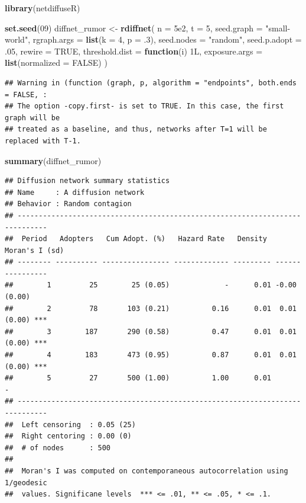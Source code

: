 \documentclass[
]{book}
\newenvironment{Shaded}{\begin{snugshade}}{\end{snugshade}}
\newcommand{\AttributeTok}[1]{\textcolor[rgb]{0.13,0.29,0.53}{#1}}
\newcommand{\ConstantTok}[1]{\textcolor[rgb]{0.56,0.35,0.01}{#1}}
\newcommand{\ControlFlowTok}[1]{\textcolor[rgb]{0.13,0.29,0.53}{\textbf{#1}}}
\newcommand{\DecValTok}[1]{\textcolor[rgb]{0.00,0.00,0.81}{#1}}
\newcommand{\FloatTok}[1]{\textcolor[rgb]{0.00,0.00,0.81}{#1}}
\newcommand{\FunctionTok}[1]{\textcolor[rgb]{0.13,0.29,0.53}{\textbf{#1}}}
\newcommand{\NormalTok}[1]{#1}
\newcommand{\OtherTok}[1]{\textcolor[rgb]{0.56,0.35,0.01}{#1}}
\newcommand{\StringTok}[1]{\textcolor[rgb]{0.31,0.60,0.02}{#1}}
\begin{document}
\begin{Shaded}
\begin{Highlighting}[]
\FunctionTok{library}\NormalTok{(netdiffuseR)}

\FunctionTok{set.seed}\NormalTok{(}\DecValTok{09}\NormalTok{)}
\NormalTok{diffnet\_rumor }\OtherTok{\textless{}{-}} \FunctionTok{rdiffnet}\NormalTok{(}
  \AttributeTok{n =} \FloatTok{5e2}\NormalTok{,}
  \AttributeTok{t =} \DecValTok{5}\NormalTok{, }
  \AttributeTok{seed.graph =} \StringTok{"small{-}world"}\NormalTok{,}
  \AttributeTok{rgraph.args =} \FunctionTok{list}\NormalTok{(}\AttributeTok{k =} \DecValTok{4}\NormalTok{, }\AttributeTok{p =}\NormalTok{ .}\DecValTok{3}\NormalTok{),}
  \AttributeTok{seed.nodes =} \StringTok{"random"}\NormalTok{,}
  \AttributeTok{seed.p.adopt =}\NormalTok{ .}\DecValTok{05}\NormalTok{,}
  \AttributeTok{rewire =} \ConstantTok{TRUE}\NormalTok{,}
  \AttributeTok{threshold.dist =} \ControlFlowTok{function}\NormalTok{(i) 1L,}
  \AttributeTok{exposure.args =} \FunctionTok{list}\NormalTok{(}\AttributeTok{normalized =} \ConstantTok{FALSE}\NormalTok{)}
\NormalTok{  )}
\end{Highlighting}
\end{Shaded}

\begin{verbatim}
## Warning in (function (graph, p, algorithm = "endpoints", both.ends = FALSE, :
## The option -copy.first- is set to TRUE. In this case, the first graph will be
## treated as a baseline, and thus, networks after T=1 will be replaced with T-1.
\end{verbatim}

\begin{Shaded}
\begin{Highlighting}[]
\FunctionTok{summary}\NormalTok{(diffnet\_rumor)}
\end{Highlighting}
\end{Shaded}

\begin{verbatim}
## Diffusion network summary statistics
## Name     : A diffusion network
## Behavior : Random contagion
## -----------------------------------------------------------------------------
##  Period   Adopters   Cum Adopt. (%)   Hazard Rate   Density   Moran's I (sd)  
## -------- ---------- ---------------- ------------- --------- ---------------- 
##        1         25        25 (0.05)             -      0.01 -0.00 (0.00)     
##        2         78       103 (0.21)          0.16      0.01  0.01 (0.00) *** 
##        3        187       290 (0.58)          0.47      0.01  0.01 (0.00) *** 
##        4        183       473 (0.95)          0.87      0.01  0.01 (0.00) *** 
##        5         27       500 (1.00)          1.00      0.01               -  
## -----------------------------------------------------------------------------
##  Left censoring  : 0.05 (25)
##  Right centoring : 0.00 (0)
##  # of nodes      : 500
## 
##  Moran's I was computed on contemporaneous autocorrelation using 1/geodesic
##  values. Significane levels  *** <= .01, ** <= .05, * <= .1.
\end{verbatim}
\end{document}
